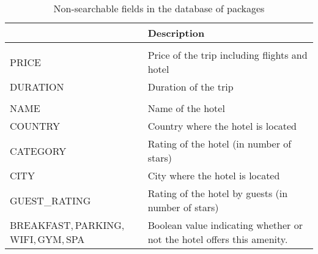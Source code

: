 \documentclass{article}
\theoremstyle{definition}
\begin{document}
\begin{table}[!h]
\begin{center}
\tabulinesep=1.5pt
\caption{Non-searchable fields in the database of packages}
\begin{tabu}to
\toprule
{}                                                                          & \textbf{Description}                                                                  \\\midrule
{}                                                              &                                                                                       \\ 
\cmidrule(r){1-1}
PRICE                                                                                   & Price of the trip including flights and hotel                                         \\ DURATION & Duration of the trip                              \\
\cmidrule(r){1-1}                                              &                                                                                       \\
\cmidrule(r){1-1}
NAME                                                                                    & Name of the hotel                                                                     \\
COUNTRY                                                                                 & Country where the hotel is located                                                    \\
CATEGORY                                                                                & Rating of the hotel (in number of stars)                                              \\
CITY                                                                                    & City where the hotel is located                                                       \\
GUEST\_RATING                                                                           & Rating of the hotel by guests (in number of stars)                                     \\
BREAKFAST,\,PARKING,\,WIFI,\,GYM,\,SPA & Boolean value indicating whether or not the hotel offers this amenity. \\

\end{tabu}
\end{center}
\end{table}
\end{document}
